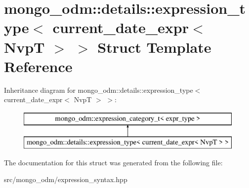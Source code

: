 \hypertarget{structmongo__odm_1_1details_1_1expression__type_3_01current__date__expr_3_01NvpT_01_4_01_4}{}\section{mongo\+\_\+odm\+:\+:details\+:\+:expression\+\_\+type$<$ current\+\_\+date\+\_\+expr$<$ NvpT $>$ $>$ Struct Template Reference}
\label{structmongo__odm_1_1details_1_1expression__type_3_01current__date__expr_3_01NvpT_01_4_01_4}
Inheritance diagram for mongo\+\_\+odm\+:\+:details\+:\+:expression\+\_\+type$<$ current\+\_\+date\+\_\+expr$<$ NvpT $>$ $>$\+:\begin{figure}[H]
\begin{center}
\leavevmode
\includegraphics[height=2.000000cm]{structmongo__odm_1_1details_1_1expression__type_3_01current__date__expr_3_01NvpT_01_4_01_4}
\end{center}
\end{figure}


The documentation for this struct was generated from the following file\+:\begin{DoxyCompactItemize}
\item 
src/mongo\+\_\+odm/expression\+\_\+syntax.\+hpp\end{DoxyCompactItemize}
